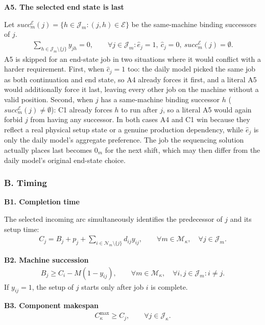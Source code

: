 \documentclass{article}
\begin{document}
\noindent\textbf{A5. The selected end state is last}

Let $succ^{\mathcal{E}}_{m}(j)=\{h\in\mathcal{J}_{m}:(j,h)\in\mathcal{E}\}$ be
the same-machine binding successors of $j$.
\begin{align}
\sum_{h\in\mathcal{J}_{m}\setminus\{j\}}y_{jh}=0,
\qquad
\forall j\in\mathcal{J}_{m}:\hat e_j=1,\ \hat c_j=0,\
succ^{\mathcal{E}}_{m}(j)=\emptyset.
\label{eq:A5-end-state}
\end{align}
A5 is skipped for an end-state job in two situations where it would conflict
with a harder requirement. First, when $\hat c_j=1$ too: the daily model
picked the same job as both continuation and end state, so A4 already forces
it first, and a literal A5 would additionally force it last, leaving every
other job on the machine without a valid position. Second, when $j$ has a
same-machine binding successor $h$ ($succ^{\mathcal{E}}_{m}(j)\neq\emptyset$):
C1 already forces $h$ to run after $j$, so a literal A5 would again forbid
$j$ from having any successor. In both cases A4 and C1 win because they
reflect a real physical setup state or a genuine production dependency, while
$\hat e_j$ is only the daily model's aggregate preference. The job the
sequencing solution actually places last becomes $0_m$ for the next shift,
which may then differ from the daily model's original end-state choice.

\subsubsection{B. Timing}

\noindent\textbf{B1. Completion time}

The selected incoming arc simultaneously identifies the predecessor of $j$
and its setup time:
\begin{align}
C_j
=
B_j+p_j
+
\sum_{i\in\mathcal{N}_{m}\setminus\{j\}}d_{ij}y_{ij},
\qquad
\forall m\in\mathcal{M}_{\kappa},\quad
\forall j\in\mathcal{J}_{m}.
\label{eq:B1-completion}
\end{align}

\noindent\textbf{B2. Machine succession}
\begin{align}
B_j
\geq
C_i-M(1-y_{ij}),
\qquad
\forall m\in\mathcal{M}_{\kappa},\quad
\forall i,j\in\mathcal{J}_{m}:i\neq j.
\label{eq:B2-machine-succession}
\end{align}
If $y_{ij}=1$, the setup of $j$ starts only after job $i$ is complete.

\noindent\textbf{B3. Component makespan}
\begin{align}
C^{\max}_{\kappa}\geq C_j,
\qquad
\forall j\in\mathcal{J}_{\kappa}.
\label{eq:B3-makespan}
\end{align}
\end{document}
